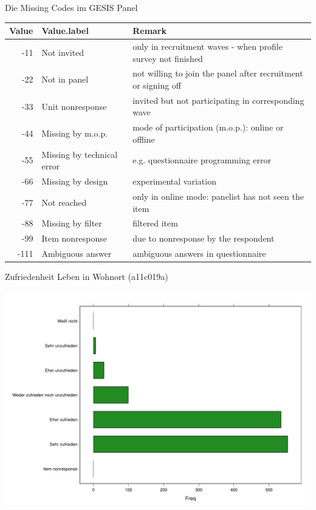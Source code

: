 \documentclass[ignorenonframetext,]{beamer}
\begin{document}
\begin{frame}{Die Missing Codes im GESIS Panel}

\begin{table}[H]
\centering\begingroup\fontsize{7}{9}\selectfont

\begin{tabular}{r|l|l}
\hline
Value & Value.label & Remark\\
\hline
-11 & Not invited & only in recruitment waves - when profile survey not finished\\
\hline
-22 & Not in panel & not willing to join the panel after recruitment or signing off\\
\hline
-33 & Unit nonresponse & invited but not participating in corresponding wave\\
\hline
-44 & Missing by m.o.p. & mode of participation (m.o.p.): online or offline\\
\hline
-55 & Missing by technical error & e.g. questionnaire programming error\\
\hline
-66 & Missing by design & experimental variation\\
\hline
-77 & Not reached & only in online mode: panelist has not seen the item\\
\hline
-88 & Missing by filter & filtered item\\
\hline
-99 & Item nonresponse & due to nonresponse by the respondent\\
\hline
-111 & Ambiguous answer & ambiguous answers in questionnaire\\
\hline
\end{tabular}\endgroup{}
\end{table}

\end{frame}

\begin{frame}{Zufriedenheit Leben in Wohnort (a11c019a)}

\includegraphics{A3_GESISPanel_files/figure-beamer/unnamed-chunk-25-1.pdf}

\end{frame}
\end{document}
